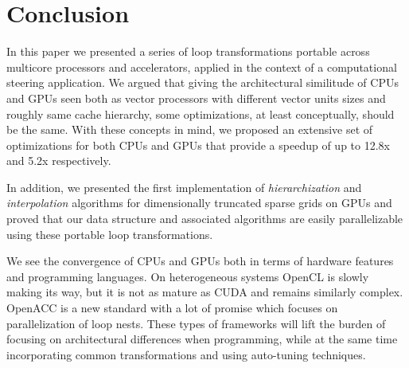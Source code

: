 \section{Conclusion}
\label{sec:conclusion}

In this paper we presented a series of loop transformations portable across
multicore processors and accelerators, applied in the context of a computational
steering application. We argued that giving the architectural similitude of CPUs
and GPUs seen both as vector processors with different vector units sizes and roughly
same cache hierarchy, some optimizations, at least conceptually, should be the
same. With these concepts in mind, we proposed an extensive set of optimizations
for both CPUs and GPUs that provide a speedup of up to 12.8x and 5.2x
respectively.

In addition, we presented the first implementation of \textit{hierarchization} and
\textit{interpolation} algorithms for dimensionally truncated sparse grids on GPUs
and proved that our data structure and associated algorithms are easily 
parallelizable using these portable loop transformations.

We see the convergence of CPUs and GPUs both in terms of hardware features and
programming languages. On heterogeneous systems OpenCL \cite{opencl} is slowly
making its way, but it is not as mature as CUDA and remains similarly complex.
OpenACC \cite{openacc} is a new standard with a lot of promise which focuses on
parallelization of loop nests. These types of frameworks will lift the burden
of focusing on architectural differences when programming, while at the same
time incorporating common transformations and using auto-tuning techniques.
